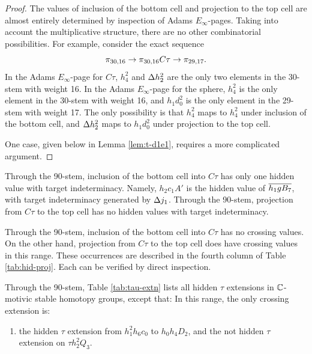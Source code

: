 \begin{proof}
The values of inclusion of the bottom cell and projection
to the top cell are almost entirely determined by inspection
of Adams $E_\infty$-pages.
Taking into account the multiplicative structure,
there are no other combinatorial possibilities.
For example, consider the exact sequence
\[
\pi_{30,16} \rightarrow \pi_{30,16} C\tau \rightarrow \pi_{29,17}.
\]
In the Adams $E_\infty$-page for $C\tau$, 
$h_4^2$ and $\Delta h_2^2$
are the only two elements in the 30-stem with weight 16.
In the Adams $E_\infty$-page for the sphere,
$h_4^2$ is the only element in the 30-stem with weight 16,
and $h_1 d_0^2$ is the only element in the 29-stem with weight 17.
The only possibility is that $h_4^2$ maps to $h_4^2$ under
inclusion of the bottom cell, and
$\Delta h_2^2$ maps to $h_1 d_0^2$ under projection to the top cell.

One case, given below in Lemma \ref{lem:t-d1e1}, 
requires a more complicated argument.
\end{proof}

\begin{remark}
Through the 90-stem, inclusion of the bottom cell into $C\tau$
has only one hidden value with target indeterminacy.
Namely, $h_2 c_1 A'$ is the hidden value of $\overline{h_1 g B_7}$,
with target indeterminacy generated by $\Delta j_1$.
Through the 90-stem, projection from $C\tau$ to the top cell
has no hidden values with target indeterminacy.
\end{remark}

\begin{remark}
Through the 90-stem,
inclusion of the bottom cell into $C\tau$ has no crossing values.
On the other hand, projection from $C\tau$ to the top cell
does have crossing values in this range.  These occurrences
are described in the fourth column of 
Table \ref{tab:hid-proj}.
Each can be verified by direct inspection.
\end{remark}

\begin{thm}
\label{thm:tau-extn}
Through the 90-stem,
Table \ref{tab:tau-extn}
lists all hidden $\tau$ extensions in $\mathbb{C}$-motivic stable homotopy groups,
except that:
In this range, the only crossing extension is:
\begin{enumerate}
\item
the hidden $\tau$ extension from $h_1^2 h_6 c_0$ to $h_0 h_4 D_2$,
and the not hidden $\tau$ extension on $\tau h_2^2 Q_3$.
\end{enumerate}
\end{thm}

